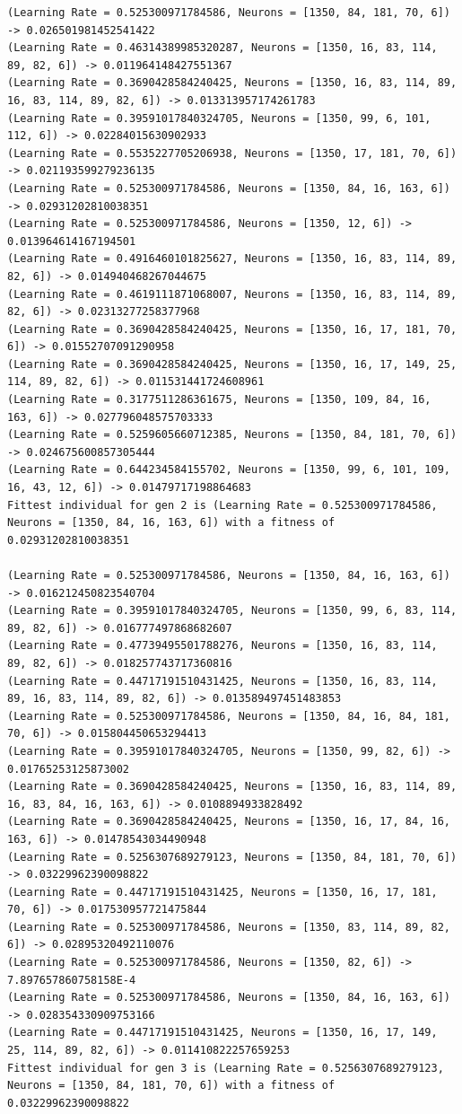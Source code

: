 \documentclass{report}
\begin{document}
\begin{verbatim}
(Learning Rate = 0.525300971784586, Neurons = [1350, 84, 181, 70, 6]) -> 0.026501981452541422
(Learning Rate = 0.46314389985320287, Neurons = [1350, 16, 83, 114, 89, 82, 6]) -> 0.011964148427551367
(Learning Rate = 0.3690428584240425, Neurons = [1350, 16, 83, 114, 89, 16, 83, 114, 89, 82, 6]) -> 0.013313957174261783
(Learning Rate = 0.39591017840324705, Neurons = [1350, 99, 6, 101, 112, 6]) -> 0.02284015630902933
(Learning Rate = 0.5535227705206938, Neurons = [1350, 17, 181, 70, 6]) -> 0.021193599279236135
(Learning Rate = 0.525300971784586, Neurons = [1350, 84, 16, 163, 6]) -> 0.02931202810038351
(Learning Rate = 0.525300971784586, Neurons = [1350, 12, 6]) -> 0.013964614167194501
(Learning Rate = 0.4916460101825627, Neurons = [1350, 16, 83, 114, 89, 82, 6]) -> 0.014940468267044675
(Learning Rate = 0.4619111871068007, Neurons = [1350, 16, 83, 114, 89, 82, 6]) -> 0.02313277258377968
(Learning Rate = 0.3690428584240425, Neurons = [1350, 16, 17, 181, 70, 6]) -> 0.01552707091290958
(Learning Rate = 0.3690428584240425, Neurons = [1350, 16, 17, 149, 25, 114, 89, 82, 6]) -> 0.011531441724608961
(Learning Rate = 0.3177511286361675, Neurons = [1350, 109, 84, 16, 163, 6]) -> 0.027796048575703333
(Learning Rate = 0.5259605660712385, Neurons = [1350, 84, 181, 70, 6]) -> 0.024675600857305444
(Learning Rate = 0.644234584155702, Neurons = [1350, 99, 6, 101, 109, 16, 43, 12, 6]) -> 0.01479717198864683
Fittest individual for gen 2 is (Learning Rate = 0.525300971784586, Neurons = [1350, 84, 16, 163, 6]) with a fitness of 0.02931202810038351

(Learning Rate = 0.525300971784586, Neurons = [1350, 84, 16, 163, 6]) -> 0.016212450823540704
(Learning Rate = 0.39591017840324705, Neurons = [1350, 99, 6, 83, 114, 89, 82, 6]) -> 0.016777497868682607
(Learning Rate = 0.47739495501788276, Neurons = [1350, 16, 83, 114, 89, 82, 6]) -> 0.018257743717360816
(Learning Rate = 0.44717191510431425, Neurons = [1350, 16, 83, 114, 89, 16, 83, 114, 89, 82, 6]) -> 0.013589497451483853
(Learning Rate = 0.525300971784586, Neurons = [1350, 84, 16, 84, 181, 70, 6]) -> 0.015804450653294413
(Learning Rate = 0.39591017840324705, Neurons = [1350, 99, 82, 6]) -> 0.01765253125873002
(Learning Rate = 0.3690428584240425, Neurons = [1350, 16, 83, 114, 89, 16, 83, 84, 16, 163, 6]) -> 0.0108894933828492
(Learning Rate = 0.3690428584240425, Neurons = [1350, 16, 17, 84, 16, 163, 6]) -> 0.01478543034490948
(Learning Rate = 0.5256307689279123, Neurons = [1350, 84, 181, 70, 6]) -> 0.03229962390098822
(Learning Rate = 0.44717191510431425, Neurons = [1350, 16, 17, 181, 70, 6]) -> 0.017530957721475844
(Learning Rate = 0.525300971784586, Neurons = [1350, 83, 114, 89, 82, 6]) -> 0.02895320492110076
(Learning Rate = 0.525300971784586, Neurons = [1350, 82, 6]) -> 7.897657860758158E-4
(Learning Rate = 0.525300971784586, Neurons = [1350, 84, 16, 163, 6]) -> 0.028354330909753166
(Learning Rate = 0.44717191510431425, Neurons = [1350, 16, 17, 149, 25, 114, 89, 82, 6]) -> 0.011410822257659253
Fittest individual for gen 3 is (Learning Rate = 0.5256307689279123, Neurons = [1350, 84, 181, 70, 6]) with a fitness of 0.03229962390098822


\end{verbatim}
\end{document}
